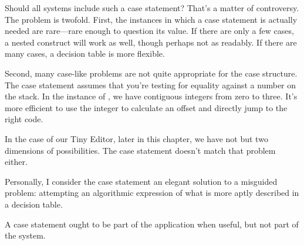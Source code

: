 Should all \Forth{} systems include such a case statement? That's a matter
of controversy. The problem is twofold. First, the instances in which a
case statement is actually needed are rare---rare enough to question its
value. If there are only a few cases, a nested  construct will work as well, though perhaps not as
readably. If there are many cases, a decision table is more flexible.

Second, many case-like problems are not quite appropriate for the case
structure. The  case statement assumes that you're testing
for equality against a number on the stack. In the instance of
, we have contiguous integers from zero to three. It's more
efficient to use the integer to calculate an offset and directly jump to
the right code.

In the case of our Tiny Editor, later in this chapter, we have not but
two dimensions of possibilities. The case statement doesn't match that
problem either.

Personally, I consider the case statement an elegant solution to a
misguided problem: attempting an algorithmic expression of what is
more aptly described in a decision table.

A case statement ought to be part of the application when useful,
but not part of the system.%
%

